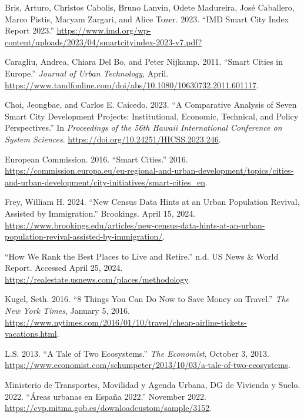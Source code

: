\documentclass[
  english,
  12pt,
  a4paper,
]{scrartcl}
\newlength{\cslhangindent}
\newenvironment{CSLReferences}[2] %
 {\begin{list}{}{%
  \setlength{\itemindent}{0pt}
  \setlength{\leftmargin}{0pt}
  \setlength{\parsep}{0pt}
  \ifodd #1
   \setlength{\leftmargin}{\cslhangindent}
   \setlength{\itemindent}{-1\cslhangindent}
  \fi
  \setlength{\itemsep}{#2\baselineskip}}}
 {\end{list}}
\begin{document}
\begin{CSLReferences}{1}{0}
Bris, Arturo, Christos Cabolis, Bruno Lanvin, Odete Madureira, José
Caballero, Marco Pistis, Maryam Zargari, and Alice Tozer. 2023. {``{IMD
Smart City Index Report} 2023.''}
\url{https://www.imd.org/wp-content/uploads/2023/04/smartcityindex-2023-v7.pdf?}

Caragliu, Andrea, Chiara Del Bo, and Peter Nijkamp. 2011. {``Smart
Cities in {Europe}.''} \emph{Journal of Urban Technology}, April.
\url{https://www.tandfonline.com/doi/abs/10.1080/10630732.2011.601117}.

Choi, Jeongbae, and Carlos E. Caicedo. 2023. {``A Comparative Analysis
of Seven {Smart City} Development Projects: {Institutional}, Economic,
Technical, and Policy Perspectives.''} In \emph{Proceedings of the 56th
{Hawaii International Conference} on {System Sciences}}.
\url{https://doi.org/10.24251/HICSS.2023.246}.

European Commission. 2016. {``Smart Cities.''} 2016.
\url{https://commission.europa.eu/eu-regional-and-urban-development/topics/cities-and-urban-development/city-initiatives/smart-cities_en}.

Frey, William H. 2024. {``New Census Data Hints at an Urban Population
Revival, Assisted by Immigration.''} Brookings. April 15, 2024.
\url{https://www.brookings.edu/articles/new-census-data-hints-at-an-urban-population-revival-assisted-by-immigration/}.

{``How We Rank the {Best Places to Live and Retire}.''} n.d. US News \&
World Report. Accessed April 25, 2024.
\url{https://realestate.usnews.com/places/methodology}.

Kugel, Seth. 2016. {``8 Things You Can Do Now to Save Money on
Travel.''} \emph{The New York Times}, January 5, 2016.
\url{https://www.nytimes.com/2016/01/10/travel/cheap-airline-tickets-vacations.html}.

L.S. 2013. {``A Tale of Two Ecosystems.''} \emph{The Economist}, October
3, 2013.
\url{https://www.economist.com/schumpeter/2013/10/03/a-tale-of-two-ecosystems}.

Ministerio de Transportes, Movilidad y Agenda Urbana, DG de Vivienda y
Suelo. 2022. {``Áreas urbanas en España 2022.''} November 2022.
\url{https://cvp.mitma.gob.es/downloadcustom/sample/3152}.


\end{CSLReferences}
\end{document}
